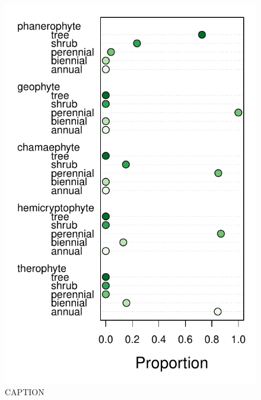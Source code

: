 \documentclass[12pt, oneside]{article}
\begin{document}
\begin{figure}[ht]
\centerline{\includegraphics{figures/figureS_compare-growth-forms.pdf}}
\caption{CAPTION}
\label{fig:compare-growth-forms}
\end{figure}
\end{document}
